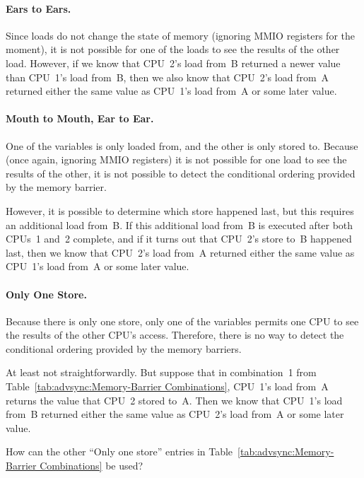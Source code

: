 \paragraph{Ears to Ears.}
	Since loads do not change the state of memory
	(ignoring MMIO registers for the moment),
	it is not possible for one of the loads to see the
	results of the other load.
	However, if we know that CPU~2's load from~B returned a
	newer value than CPU~1's load from~B, then we also know
	that CPU~2's load from~A returned either the same value
	as CPU~1's load from~A or some later value.

\paragraph{Mouth to Mouth, Ear to Ear.}
	One of the variables is only loaded from, and the other
	is only stored to.
	Because (once again, ignoring MMIO registers) it is not
	possible for one load to see the results of the other,
	it is not possible to detect the conditional ordering
	provided by the memory barrier.

	However, it is possible to determine which store happened
	last, but this requires an additional load from~B.
	If this additional load from~B is executed after both
	CPUs~1 and~2 complete, and if it turns out that CPU~2's
	store to~B happened last, then we know
	that CPU~2's load from~A returned either the same value
	as CPU~1's load from~A or some later value.

\paragraph{Only One Store.}
	Because there is only one store, only one of the variables
	permits one CPU to see the results of the other CPU's
	access.
	Therefore, there is no way to detect the
	conditional ordering provided by the memory barriers.

	At least not straightforwardly.
	But suppose that in combination~1 from
	Table~\ref{tab:advsync:Memory-Barrier Combinations},
	CPU~1's load from~A returns the value that CPU~2 stored
	to~A.  Then we know that CPU~1's load from~B returned
	either the same value as CPU~2's load from~A or some later value.

\QuickQuiz{}
	How can the other ``Only one store'' entries in
	Table~\ref{tab:advsync:Memory-Barrier Combinations}
	be used?
 \QuickQuizEnd

